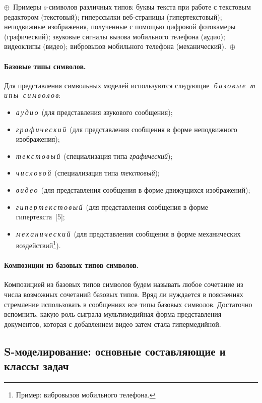 \begin{multicols}{2}
\noindent
$\oplus$~Примеры s-символов различных
типов: буквы текста при работе с текстовым редактором (текстовый);
гиперссылки веб-страницы (гипертекстовый); неподвижные изображения,
полученные с помощью цифровой фотокамеры (графический); звуковые
сигналы вызова мобильного телефона (аудио); видеоклипы (видео); вибровызов
мобильного телефона (механический).~$\oplus$

\paragraph*{Базовые типы символов.}Для представления
сим\-воль\-ных моделей используются следующие\,\ 
\textit{б\,а\,\-з\,о\,\-в\,ы\,е\,\ т\,и\,п\,ы\,\ с\,и\,м\,в\,о\,л\,о\,в}:
\begin{itemize}
\item \textit{а\,у\,д\,и\,о\,} (для представления звукового сообщения);
\item \textit{г\,р\,а\,ф\,и\,ч\,е\,с\,к\,и\,й\,} (для представления
сообщения в форме неподвижного изображения);
\item \textit{т\,е\,к\,с\,т\,о\,в\,ы\,й\,} (специализация типа
\textit{графический});
\item \textit{ч\,и\,с\,л\,о\,в\,о\,й\,} (специализация типа
\textit{текстовый});
\item \textit{в\,и\,д\,е\,о\,} (для представления сообщения в форме
движущихся изображений);
\item \textit{г\,и\,п\,е\,р\,т\,е\,к\,с\,т\,о\,в\,ы\,й\,} (для представления сообщения в форме
гипертекста~[5];
\item \textit{м\,е\,х\,а\,н\,и\,ч\,е\,с\,к\,и\,й\,} (для представления сообщения в форме
механических воздействий\footnote{Пример: вибровызов мобильного телефона.}).
\end{itemize}

\paragraph*{Композиции из базовых типов символов.}Композицией
из базовых типов символов будем называть любое сочетание из
числа возможных сочетаний базовых типов. Вряд ли нуждается в пояснениях
стремление использовать в сообщениях все типы базовых символов.
Достаточно вспомнить, какую роль сыграла мультимедийная форма
представления документов, которая с добавлением видео затем стала
гипермедийной.

\subsection{S-моделирование: основные составляющие и классы задач}


\end{multicols}
